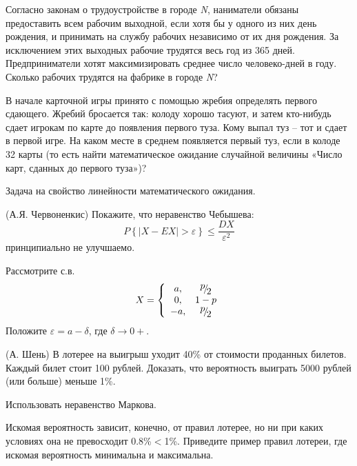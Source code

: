 \begin{problem}
Согласно законам о трудоустройстве в городе \textit{N}, наниматели обязаны предоставить всем рабочим выходной, если хотя бы у одного из них день рождения, и принимать на службу рабочих независимо от их дня рождения. За исключением этих выходных рабочие трудятся весь год из 365 дней. Предприниматели хотят максимизировать среднее число человеко-дней в году. Сколько рабочих трудятся на фабрике в городе \textit{N}?

\end{problem}

\begin{problem}
В начале карточной игры принято с помощью жребия определять первого сдающего. Жребий бросается так: колоду хорошо тасуют, и затем кто-нибудь сдает игрокам по карте до появления первого туза. Кому выпал туз -- тот и сдает в первой игре. На каком месте в среднем появляется первый туз, если в колоде 32 карты (то есть найти математическое ожидание случайной величины «Число карт, сданных до первого туза»)?

\begin{ordre} 
Задача на свойство линейности математического ожидания.
\end{ordre}

\end{problem}

\begin{problem}
(А.Я. Червоненкис) Покажите, что неравенство Чебышева:
\[P\left\{\left|X-EX\right|>\varepsilon \right\}\le \frac{DX}{\varepsilon ^{2} } \] 
принципиально не улучшаемо.

\begin{ordre} 
Рассмотрите с.в. 
\[X=\left\{\begin{array}{cc} {a,} & {{\raise0.7ex\hbox{$ p $}\!\mathord{\left/ {\vphantom {p 2}} \right. \kern-\nulldelimiterspace}\!\lower0.7ex\hbox{$ 2 $}} } \\ {0,} & {1-p} \\ {-a,} & {{\raise0.7ex\hbox{$ p $}\!\mathord{\left/ {\vphantom {p 2}} \right. \kern-\nulldelimiterspace}\!\lower0.7ex\hbox{$ 2 $}} } \end{array}\right. \] 
Положите $\varepsilon =a-\delta $, где $\delta \to 0+$.
\end{ordre}

\end{problem}

\begin{problem}

 (А. Шень) В лотерее на выигрыш уходит 40\% от стоимости проданных билетов. Каждый билет стоит 100 рублей. Доказать, что вероятность выиграть 5000 рублей (или больше) меньше 1\%.

\begin{ordre} 
Использовать неравенство Маркова.
\end{ordre}

Искомая вероятность зависит, конечно, от правил лотерее, но ни при каких условиях она не превосходит 0.8\%$<$1\%.
Приведите пример правил лотереи, где искомая вероятность минимальна и максимальна.

\end{problem}

